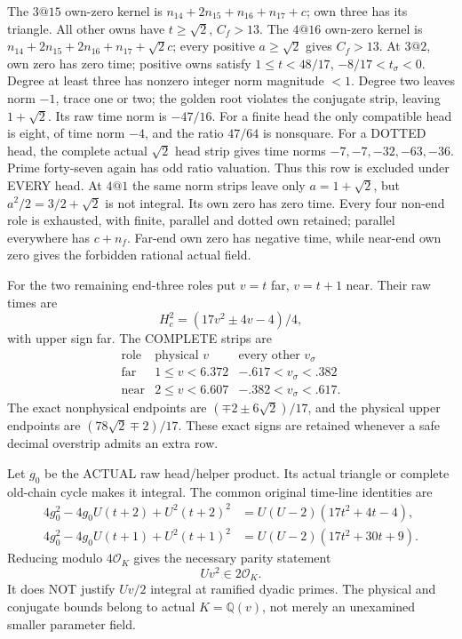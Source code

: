 The \(3@15\) own-zero kernel is
\(n_{14}+2n_{15}+n_{16}+n_{17}+c\);
own three has its triangle.
All other owns have \(t\ge\sqrt2\), \(C_f>13\).
The \(4@16\) own-zero kernel is
\(n_{14}+2n_{15}+2n_{16}+n_{17}+\sqrt2c\);
every positive \(a\ge\sqrt2\) gives \(C_f>13\).
At \(3@2\), own zero has zero time; positive
owns satisfy
\(1\le t<48/17\), \(-8/17<t_\sigma<0\).
Degree at least three has nonzero integer norm
magnitude \(<1\).
Degree two leaves norm \(-1\), trace one or two;
the golden root violates the conjugate strip,
leaving \(1+\sqrt2\).
Its raw time norm is \(-47/16\).
For a finite head the only compatible head is
eight, of time norm \(-4\), and the ratio
\(47/64\) is nonsquare.
For a DOTTED head, the complete actual
\(\sqrt2\) head strip gives time norms
\(-7,-7,-32,-63,-36\).
Prime forty-seven again has odd ratio valuation.
Thus this row is excluded under EVERY head.
At \(4@1\) the same norm strips leave only
\(a=1+\sqrt2\), but \(a^2/2=3/2+\sqrt2\)
is not integral.
Its own zero has zero time.
Every four non-end role is exhausted, with
finite, parallel and dotted own retained;
parallel everywhere has \(c+n_f\).
Far-end own zero has negative time, while
near-end own zero gives the forbidden rational
actual field.

For the two remaining end-three roles put
\(v=t\) far, \(v=t+1\) near.
Their raw times are
\[
 H_c^2=(17v^2\pm4v-4)/4,
\]
with upper sign far.
The COMPLETE strips are
\[
\begin{array}{c|c|c}
 \text{role}&\text{physical }v&\text{every other }v_\sigma\\ \hline
 \text{far}&1\le v<6.372&-.617<v_\sigma<.382\\
 \text{near}&2\le v<6.607&-.382<v_\sigma<.617 .
\end{array}
\]
The exact nonphysical endpoints are
\((\mp2\pm6\sqrt2)/17\), and the physical
upper endpoints are
\((78\sqrt2\mp2)/17\).
These exact signs are retained whenever a
safe decimal overstrip admits an extra row.

Let \(g_0\) be the ACTUAL raw head/helper
product.
Its actual triangle or complete old-chain
cycle makes it integral.
The common original time-line identities are
\[
 \begin{split}
 4g_0^2-4g_0U(t+2)+U^2(t+2)^2
                  &=U(U-2)(17t^2+4t-4),\\
 4g_0^2-4g_0U(t+1)+U^2(t+1)^2
                  &=U(U-2)(17t^2+30t+9).
 \end{split}
\]
Reducing modulo \(4\mathcal O_K\) gives the
necessary parity statement
\[
                              Uv^2\in2\mathcal O_K .
\tag{D17P}\label{eq:arithD17helperparity}
\]
It does NOT justify \(Uv/2\) integral at
ramified dyadic primes.
The physical and conjugate bounds belong to
actual \(K=\mathbb Q(v)\), not merely an
unexamined smaller parameter field.

